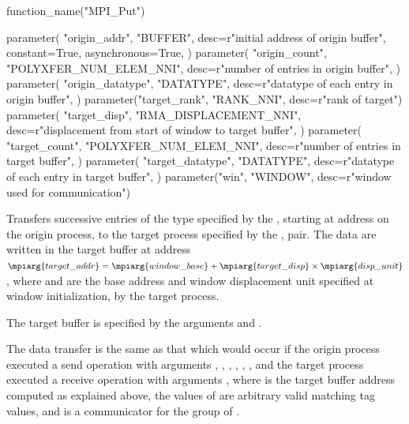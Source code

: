 %
%
\begin{mpi-binding}
    function_name("MPI_Put")
    
    parameter(
        "origin_addr",
        "BUFFER",
        desc=r"initial address of origin buffer",
        constant=True,
        asynchronous=True,
    )
    parameter(
        "origin_count",
        "POLYXFER_NUM_ELEM_NNI",
        desc=r"number of entries in origin buffer",
    )
    parameter(
        "origin_datatype",
        "DATATYPE",
        desc=r"datatype of each entry in origin buffer",
    )
    parameter("target_rank", "RANK_NNI", desc=r"rank of target")
    parameter(
        "target_disp",
        "RMA_DISPLACEMENT_NNI",
        desc=r"displacement from start of window to target buffer",
    )
    parameter(
        "target_count",
        "POLYXFER_NUM_ELEM_NNI",
        desc=r"number of entries in target buffer",
    )
    parameter(
        "target_datatype",
        "DATATYPE",
        desc=r"datatype of each entry in target buffer",
    )
    parameter("win", "WINDOW", desc=r"window used for communication")
\end{mpi-binding}

Transfers 
successive entries of the type specified by the
, starting at address 
on the origin process, to the target process
specified by the ,  pair. 
The data are written in
the target buffer at address
$\mpiarg{target\_addr} = \mpiarg{window\_base} + 
\mpiarg{target\_disp}\times\mpiarg{disp\_unit}$, where
 and 
are the base address and window displacement unit
specified at window initialization, by the target process.

The target buffer is specified by the arguments
and .

The data transfer is the same as that which would occur
if the origin process executed a send
operation
with arguments , , 
,
, , , and the target
process executed a 
receive operation with arguments
, where
 is the target buffer address computed as
explained above, the values of  are arbitrary valid
matching tag values, and  is a communicator for the group of .

